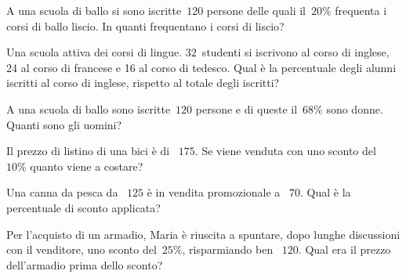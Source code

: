 \begin{esercizio}
 \label{ese:3.86}
A una scuola di ballo si sono iscritte~$120$ persone delle quali il~$20\%$ frequenta i corsi di ballo liscio.
In quanti frequentano i corsi di liscio?
\end{esercizio}

\begin{esercizio}
 \label{ese:3.87}
Una scuola attiva dei corsi di lingue. $32$~studenti si iscrivono al corso di inglese, 24 al
corso di francese e 16 al corso di tedesco.
Qual è la percentuale degli alunni iscritti al corso di inglese, rispetto al totale degli iscritti?
\end{esercizio}

\begin{esercizio}
 \label{ese:3.88}
A una scuola di ballo sono iscritte~$120$ persone e di queste il~$68\%$ sono donne. Quanti sono gli uomini?
\end{esercizio}

\begin{esercizio}
 \label{ese:3.89}
 Il prezzo di listino di una bici è di \officialeuro~$175$. Se viene venduta con uno sconto del~$10\%$ quanto viene a costare?
\end{esercizio}

\begin{esercizio}[\Ast]
 \label{ese:3.90}
Una canna da pesca da \officialeuro~$125$ è in vendita promozionale a \officialeuro~$70$.
Qual è la percentuale di sconto applicata?
\end{esercizio}

\begin{esercizio}[\Ast]
 \label{ese:3.91}
Per l'acquisto di un armadio, Maria è riuscita a spuntare, dopo lunghe discussioni con il venditore, uno sconto del~$25\%$, risparmiando ben \officialeuro~$120$. Qual era il prezzo dell'armadio prima dello sconto?
\end{esercizio}


